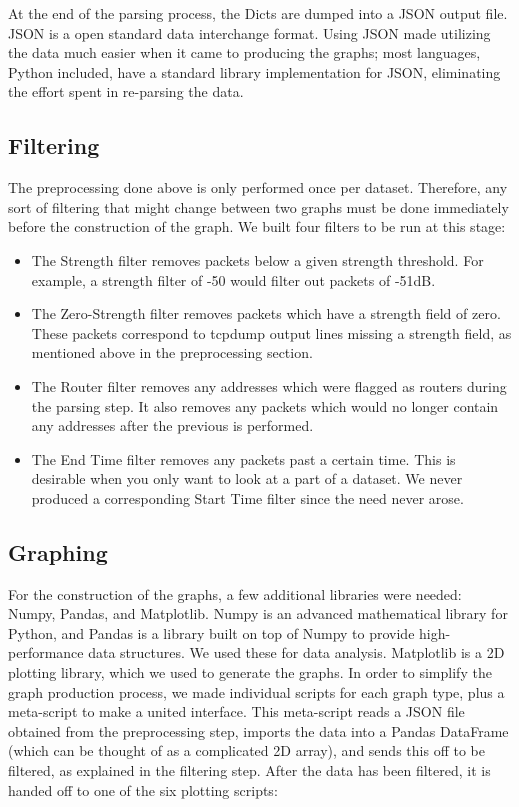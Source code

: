At the end of the parsing process, the Dicts are dumped into a JSON output file.
JSON is a open standard data interchange format.
Using JSON made utilizing the data much easier when it came to producing the graphs; most languages, Python included, have a standard library implementation for JSON, eliminating the effort spent in re-parsing the data. %

\subsection{Filtering}
The preprocessing done above is only performed once per dataset.
Therefore, any sort of filtering that might change between two graphs must be done immediately before the construction of the graph.
We built four filters to be run at this stage:
\begin{itemize}
\item The Strength filter removes packets below a given strength threshold.
  For example, a strength filter of -50 would filter out packets of -51dB.
\item The Zero-Strength filter removes packets which have a strength field of zero.
  These packets correspond to tcpdump output lines missing a strength field, as mentioned above in the preprocessing section.
\item The Router filter removes any addresses which were flagged as routers during the parsing step.
  It also removes any packets which would no longer contain any addresses after the previous is performed.
\item The End Time filter removes any packets past a certain time.
  This is desirable when you only want to look at a part of a dataset.
  We never produced a corresponding Start Time filter since the need never arose.
\end{itemize}

\subsection{Graphing}
For the construction of the graphs, a few additional libraries were needed: Numpy, Pandas, and Matplotlib.
Numpy is an advanced mathematical library for Python, and Pandas is a library built on top of Numpy to provide high-performance data structures.
We used these for data analysis.
Matplotlib is a 2D plotting library, which we used to generate the graphs. 
In order to simplify the graph production process, we made individual scripts for each graph type, plus a meta-script to make a united interface.
This meta-script reads a JSON file obtained from the preprocessing step, imports the data into a Pandas DataFrame (which can be thought of as a complicated 2D array), and sends this off to be filtered, as explained in the filtering step.
After the data has been filtered, it is handed off to one of the six plotting scripts:


